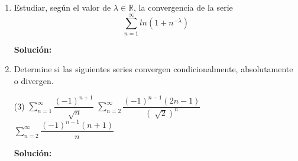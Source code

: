 \documentclass[12pt]{article}
\newenvironment{solucion}
{\begin{mdframed}[backgroundcolor=black!10]
		{\bf Solución:}\\
	}
	{
	\end{mdframed}
}
\newenvironment{preguntas}
{\begin{enumerate}\itemsep12pt
	}
	{
	\end{enumerate}
}
\newcommand{\ev}{\Big|}
\newcommand{\ra}{\rightarrow}
\newcommand{\R}{\mathbb{R}}
\begin{document}
\begin{preguntas}
\begin{solucion}
\begin{enumerate}[a)]
			\\
			Veamos ahora que pasa con $\sum\limits_{n=2}^{\infty} \dfrac{1}{nln(n)}$. Usando el criterio de la integral, tenemos que la serie se comportara igual a $\displaystyle\int_2^{\infty} \dfrac{1}{xln(x)}$. \\
			\\
			Calculemos entonces esta integral impropia,
			$$\displaystyle\int_2^{\infty} \dfrac{1}{xln(x)} =  ln(ln(x)) \ev_2^{\infty} = \infty$$
			Luego, $\displaystyle\int_2^{\infty} \dfrac{1}{xln(x)}$ diverge, por lo que por criterio de la integral, $\sum\limits_{n=2}^{\infty} \dfrac{1}{nln(n)}$ tambiém diverge. Finalmente, por el criterio de comparación al limite, la serie $\sum\limits_{n=2}^{\infty}\dfrac{n}{(n+1)^2ln(n)}$ es divergente.
\item $\sum\limits_{n=1}^{\infty}\dfrac{n!}{n^n}$\\
			\\
			Recordemos que en el infinito,
			$$n^n > n! > a^n > n > ln(n)$$
			El límite de la sucesión es
			$$\lim\limits_{n\ra\infty}\dfrac{n!}{n^n} = 0$$
			Usando el criterio de la razón,
			$$\lim\limits_{n \ra \infty} \dfrac{a_{n+1}}{a_n}
			= \lim\limits_{n \ra \infty} \dfrac{\dfrac{(n+1)!}{(n+1)^{n+1}}}{\dfrac{n!}{n^n}}
			= \lim\limits_{n \ra \infty} \dfrac{(n+1)!}{n!}\dfrac{n^n}{(n+1)^{n+1}}$$
			$$= \lim\limits_{n \ra \infty} \dfrac{(n+1)}{1}\dfrac{n^n}{(n+1)^{n+1}}
			= \lim\limits_{n \ra \infty} \dfrac{n^n}{(n+1)^{n}}
			= \lim\limits_{n \ra \infty} \left(\dfrac{n}{n+1}\right)^n$$
			$$= \lim\limits_{n \ra \infty} \dfrac{1}{\left(\dfrac{n+1}{n}\right)^n}
			= \dfrac{1}{e} < 1$$
			Por criterio de la razón, la serie es convergente.
\end{enumerate}
\end{solucion}
\item Estudiar, según el valor de $\lambda \in \R$, la convergencia de la serie
	$$\sum\limits_{n=1}^{\infty}ln(1+n^{-\lambda})$$
\begin{solucion}

\end{solucion}
\item Determine si las siguientes series convergen condicionalmente, absolutamente o divergen.
\begin{tasks}(3)
\task $\sum\limits_{n=1}^{\infty}\dfrac{(-1)^{n+1}}{\sqrt[]{n}}$
\task $\sum\limits_{n=2}^{\infty}\dfrac{(-1)^{n-1}(2n-1)}{(\sqrt[]{2})^n}$
\task $\sum\limits_{n=2}^{\infty}\dfrac{(-1)^{n-1}(n+1)}{n}$
\end{tasks}
\begin{solucion}


\end{solucion}
\end{preguntas}
\end{document}
